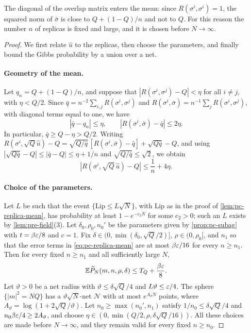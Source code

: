 The diagonal of the overlap matrix enters the mean: since $R(\sigma^i,\sigma^i)=1$, the squared norm of $\bar\sigma$ is close to $Q+(1-Q)/n$ and not to $Q$. For this reason the number $n$ of replicas is fixed and large, and it is chosen before $N\to\infty$.

\begin{proof}
We first relate $\hat u$ to the replicas, then choose the parameters, and finally bound the Gibbs probability by a union over a net.

\paragraph{Geometry of the mean.}
Let $q_n=Q+(1-Q)/n$, and suppose that $|R(\sigma^i,\sigma^j)-Q|<\eta$ for all $i\ne j$, with $\eta<Q/2$. Since $\bar q=n^{-2}\sum_{i,j}R(\sigma^i,\sigma^j)$ and $R(\sigma^i,\bar\sigma)=n^{-1}\sum_jR(\sigma^i,\sigma^j)$, with diagonal terms equal to one, we have
\[
|\bar q-q_n|\le\eta,\qquad|R(\sigma^i,\bar\sigma)-\bar q|\le2\eta.
\]
In particular, $\bar q\ge Q-\eta>Q/2$. Writing $R(\sigma^i,\sqrt Q\hat u)-Q=\sqrt{Q/\bar q}\,[R(\sigma^i,\bar\sigma)-\bar q]+\sqrt{Q\bar q}-Q$, and using $|\sqrt{Q\bar q}-Q|\le|\bar q-Q|\le\eta+1/n$ and $\sqrt{Q/\bar q}\le\sqrt2$, we obtain
\begin{equation}\label{eq:pc-mean-projection}
|R(\sigma^i,\sqrt Q\,\hat u)-Q|\le\frac1n+4\eta.
\end{equation}

\paragraph{Choice of the parameters.}
Let $L$ be such that the event $\{\mathrm{Lip}\le L\sqrt N\}$, with $\mathrm{Lip}$ as in the proof of \cref{lem:pc-replica-mean}, has probability at least $1-e^{-c_2N}$ for some $c_2>0$; such an $L$ exists by \cref{lem:pre-field}(3). Let $\delta_0,\rho_0,n_0'$ be the parameters given by \cref{prop:pc-subag} with $t=\beta\varepsilon/8$ and $c=1$. Fix $\delta\in(0,\min(\delta_0,\sqrt Q/2)]$, $\rho\in(0,\rho_0]$, and $n_1$ so that the error terms in \eqref{eq:pc-replica-mean} are at most $\beta\varepsilon/16$ for every $n\ge n_1$. Then for every fixed $n\ge n_1$ and all sufficiently large $N$,
\begin{equation}\label{eq:pc-mean-choice}
\mathbb E\widetilde P_N(m,n,\rho,\delta)\le T_Q+\frac{\beta\varepsilon}8.
\end{equation}
Let $\vartheta>0$ be a net radius with $\vartheta\le\delta\sqrt Q/4$ and $L\vartheta\le\varepsilon/4$. The sphere $\{|m|^2=NQ\}$ has a $\vartheta\sqrt N$-net $\mathcal N$ with at most $e^{A_\vartheta N}$ points, where $A_\vartheta=\log(1+2\sqrt Q/\vartheta)$. Let $n_0\ge\max(n_0',n_1)$ satisfy $1/n_0\le\delta\sqrt Q/4$ and $n_0\beta\varepsilon/4\ge2A_\vartheta$, and choose $\eta\in(0,\min(Q/2,\rho,\delta\sqrt Q/16))$. All these choices are made before $N\to\infty$, and they remain valid for every fixed $n\ge n_0$.


\end{proof}
